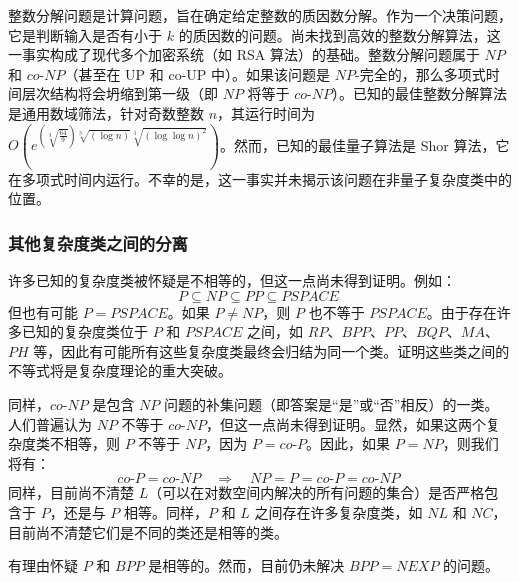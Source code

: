 整数分解问题是计算问题，旨在确定给定整数的质因数分解。作为一个决策问题，它是判断输入是否有小于 \( k \) 的质因数的问题。尚未找到高效的整数分解算法，这一事实构成了现代多个加密系统（如 RSA 算法）的基础。整数分解问题属于 \( NP \) 和 \( co\text{-}NP \)（甚至在 UP 和 co-UP 中）。如果该问题是 \( NP \)-完全的，那么多项式时间层次结构将会坍缩到第一级（即 \( NP \) 将等于 \( co\text{-}NP \)）。已知的最佳整数分解算法是通用数域筛法，针对奇数整数 \( n \)，其运行时间为 \( O(e^{\left({\sqrt[3]{\frac{64}{9}}}\right)\sqrt[3]{(\log n)}\sqrt[3]{(\log \log n)^2}}) \)。然而，已知的最佳量子算法是 Shor 算法，它在多项式时间内运行。不幸的是，这一事实并未揭示该问题在非量子复杂度类中的位置。

\subsubsection{其他复杂度类之间的分离}  
许多已知的复杂度类被怀疑是不相等的，但这一点尚未得到证明。例如：
\[
P \subseteq NP \subseteq PP \subseteq PSPACE~
\]
但也有可能 \( P = PSPACE \)。如果 \( P \neq NP \)，则 \( P \) 也不等于 \( PSPACE \)。由于存在许多已知的复杂度类位于 \( P \) 和 \( PSPACE \) 之间，如 \( RP \)、\( BPP \)、\( PP \)、\( BQP \)、\( MA \)、\( PH \) 等，因此有可能所有这些复杂度类最终会归结为同一个类。证明这些类之间的不等式将是复杂度理论的重大突破。

同样，\( co\text{-}NP \) 是包含 \( NP \) 问题的补集问题（即答案是“是”或“否”相反）的一类。人们普遍认为 \( NP \) 不等于 \( co\text{-}NP \)，但这一点尚未得到证明。显然，如果这两个复杂度类不相等，则 \( P \) 不等于 \( NP \)，因为 \( P = co\text{-}P \)。因此，如果 \( P = NP \)，则我们将有：
\[
co\text{-}P = co\text{-}NP \quad \Rightarrow \quad NP = P = co\text{-}P = co\text{-}NP~
\]
同样，目前尚不清楚 \( L \)（可以在对数空间内解决的所有问题的集合）是否严格包含于 \( P \)，还是与 \( P \) 相等。同样，\( P \) 和 \( L \) 之间存在许多复杂度类，如 \( NL \) 和 \( NC \)，目前尚不清楚它们是不同的类还是相等的类。

有理由怀疑 \( P \) 和 \( BPP \) 是相等的。然而，目前仍未解决 \( BPP = NEXP \) 的问题。


   


  
  
  




 